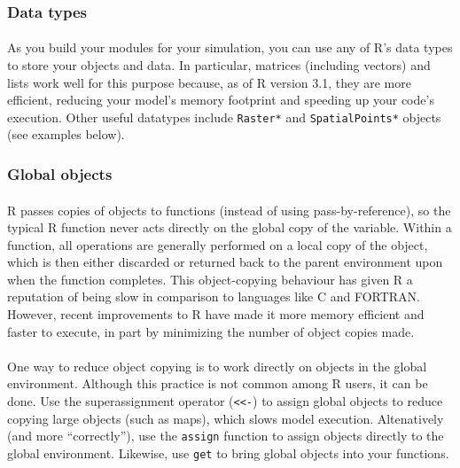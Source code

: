 \documentclass{article}
\begin{document}
\subsubsection{Data types}

\paragraph{}
As you build your modules for your simulation, you can use any of \textsf{R}'s data types to store your objects and data. In particular, matrices (including vectors) and lists work well for this purpose because, as of \textsf{R} version 3.1, they are more efficient, reducing your model's memory footprint and speeding up your code's execution. Other useful datatypes include \texttt{Raster*} and \texttt{SpatialPoints*} objects (see examples below).

\subsubsection{Global objects}

\paragraph{}
\textsf{R} passes copies of objects to functions (instead of using pass-by-reference), so the typical \textsf{R} function never acts directly on the global copy of the variable. Within a function, all operations are generally performed on a local copy of the object, which is then either discarded or returned back to the parent environment upon when the function completes. This object-copying behaviour has given \textsf{R} a reputation of being slow in comparison to languages like C and FORTRAN. However, recent improvements to \textsf{R} have made it more memory efficient and faster to execute, in part by minimizing the number of object copies made.

\paragraph{}
One way to reduce object copying is to work directly on objects in the global environment. Although this practice is not common among \textsf{R} users, it can be done. Use the superassignment operator (\texttt{<}\texttt{<-}) to assign global objects to reduce copying large objects (such as maps), which slows model execution. Altenatively (and more ``correctly''), use the \texttt{assign} function to assign objects directly to the global environment. Likewise, use \texttt{get} to bring global objects into your functions.
\end{document}
